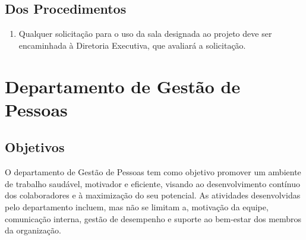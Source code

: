        \subsection{Dos Procedimentos}
            \begin{enumerate}
                \item Qualquer solicitação para o uso da sala designada ao projeto deve ser encaminhada à Diretoria Executiva, que avaliará a solicitação.
            \end{enumerate}

    \section{Departamento de Gestão de Pessoas}
        \subsection{Objetivos}
            O departamento de Gestão de Pessoas tem como objetivo promover um ambiente de trabalho saudável, motivador e eficiente, visando ao desenvolvimento contínuo dos colaboradores e à maximização do seu potencial. As atividades desenvolvidas pelo departamento incluem, mas não se limitam a, motivação da equipe, comunicação interna, gestão de desempenho e suporte ao bem-estar dos membros da organização.
            
